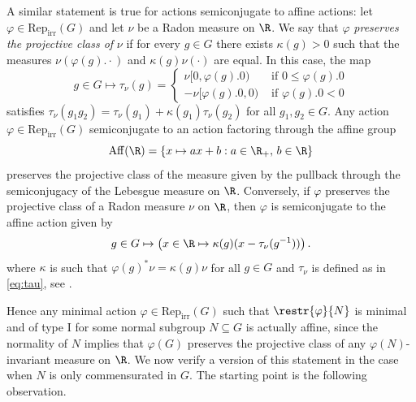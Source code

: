 \documentclass[reqno]{amsart}
\begin{document}
A similar statement is true for actions semiconjugate to affine actions: let $\varphi \in \mathrm{Rep}_\mathrm{irr}(G)$ and let $\nu$ be a Radon measure on $\R$. We say that $\varphi$ \emph{preserves the projective class of} $\nu$ if for every $g \in G$ there exists $\kappa(g) > 0$ such that the measures $ \nu(\varphi(g).\cdot)$ and $\kappa(g)\nu(\cdot)$ are equal. In this case, the map
\begin{equation} \label{eq:tau}
        g \in G \mapsto \tau_\nu(g) =
        \begin{cases}
                \nu[0,\varphi(g).0) & \text{ if } 0 \leq \varphi(g).0\\
                -\nu[\varphi(g).0, 0) & \text{ if } \varphi(g).0 < 0
        \end{cases}
\end{equation}
satisfies $\tau_\nu(g_1g_2) = \tau_\nu(g_1) + \kappa(g_1)\tau_\nu(g_2)$ for all $g_1,g_2 \in G$. Any action $\varphi \in \mathrm{Rep}_\mathrm{irr}(G)$ semiconjugate to an action factoring through the affine group
\[
        \mathrm{Aff}(\R) = \{x \mapsto ax + b : a \in \R_+,\, b \in \R\}
\] preserves the projective class of the measure given by the pullback through the semiconjugacy of the Lebesgue measure on $\R$. Conversely, if $\varphi$ preserves the projective class of a Radon measure $\nu$ on $\R$, then $\varphi$ is semiconjugate to the affine action given by
\begin{equation} \label{eq:affine}
        g \in G \mapsto \left( x \in \R \mapsto \kappa(g)(x - \tau_\nu(g^{-1}))\right).
\end{equation}
where $\kappa$ is such that $\varphi(g)^\ast \nu = \kappa(g)\nu$ for all $g \in G$ and $\tau_\nu$ is defined as in \eqref{eq:tau}, see \cite[Proposition 1.2.2]{Navas2011}.

Hence any minimal action $\varphi \in \mathrm{Rep}_\mathrm{irr}(G)$ such that $\restr{\varphi}{N}$ is minimal and of type I for some normal subgroup $N \subseteq G$ is actually affine, since the normality of $N$ implies that $\varphi(G)$ preserves the projective class of any $\varphi(N)$-invariant measure on $\R$. We now verify a version of this statement in the case when $N$ is only commensurated in $G$. The starting point is the following observation.%
\end{document}
